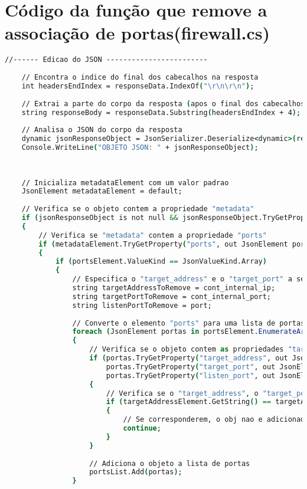 
\chapter{Código da função que remove a associação de portas(firewall.cs)}
\label{chap:zd}


\begin{lstlisting}[language=csh, caption={Edição do objeto Json "ports" para remover contúdo especificado}]
    //------ Edicao do JSON ------------------------
    
    // Encontra o indice do final dos cabecalhos na resposta
    int headersEndIndex = responseData.IndexOf("\r\n\r\n");
    
    // Extrai a parte do corpo da resposta (apos o final dos cabecalhos)
    string responseBody = responseData.Substring(headersEndIndex + 4);
    
    // Analisa o JSON do corpo da resposta
    dynamic jsonResponseObject = JsonSerializer.Deserialize<dynamic>(responseBody);
    Console.WriteLine("OBJETO JSON: " + jsonResponseObject);
    
    
    
    // Inicializa metadataElement com um valor padrao
    JsonElement metadataElement = default;
    
    // Verifica se o objeto contem a propriedade "metadata"
    if (jsonResponseObject is not null && jsonResponseObject.TryGetProperty("metadata", out metadataElement))
    {
        // Verifica se "metadata" contem a propriedade "ports"
        if (metadataElement.TryGetProperty("ports", out JsonElement portsElement))
        {
            if (portsElement.ValueKind == JsonValueKind.Array)
            {
                // Especifica o "target_address" e o "target_port" a serem removidos
                string targetAddressToRemove = cont_internal_ip;
                string targetPortToRemove = cont_internal_port;
                string listenPortToRemove = port;
    
                // Converte o elemento "ports" para uma lista de portas
                foreach (JsonElement portas in portsElement.EnumerateArray())
                {
                    // Verifica se o objeto contem as propriedades "target_address" e "target_port" e "listen_port"
                    if (portas.TryGetProperty("target_address", out JsonElement targetAddressElement) &&
                        portas.TryGetProperty("target_port", out JsonElement targetPortElement) &&
                        portas.TryGetProperty("listen_port", out JsonElement listenPortElement))
                    {
                        // Verifica se o "target_address", o "target_port" e o "listen_port" correspondem aos especificados
                        if (targetAddressElement.GetString() == targetAddressToRemove && targetPortElement.GetString() == targetPortToRemove && listenPortElement.GetString() == listenPortToRemove)
                        {
                            // Se corresponderem, o obj nao e adicionado lista de portas
                            continue;
                        }
                    }
    
                    // Adiciona o objeto a lista de portas
                    portsList.Add(portas);
                }
    \end{lstlisting} 
